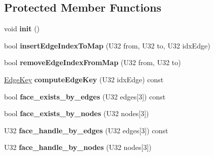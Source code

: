 \subsection*{Protected Member Functions}
\begin{DoxyCompactItemize}
\item 
\hypertarget{classps_1_1elastic_1_1VolMesh_abb320bf8584333cca98e316b8d5ad27d}{}void {\bfseries init} ()\label{classps_1_1elastic_1_1VolMesh_abb320bf8584333cca98e316b8d5ad27d}

\item 
\hypertarget{classps_1_1elastic_1_1VolMesh_a759d2e1cf8ba362be411646bfabc389e}{}bool {\bfseries insert\+Edge\+Index\+To\+Map} (U32 from, U32 to, U32 idx\+Edge)\label{classps_1_1elastic_1_1VolMesh_a759d2e1cf8ba362be411646bfabc389e}

\item 
\hypertarget{classps_1_1elastic_1_1VolMesh_aed8c037e96e3874e05af24e49dfd2746}{}bool {\bfseries remove\+Edge\+Index\+From\+Map} (U32 from, U32 to)\label{classps_1_1elastic_1_1VolMesh_aed8c037e96e3874e05af24e49dfd2746}

\item 
\hypertarget{classps_1_1elastic_1_1VolMesh_a277fde736ee27c4b6f8fdfbade377b77}{}\hyperlink{classps_1_1elastic_1_1EdgeKey}{Edge\+Key} {\bfseries compute\+Edge\+Key} (U32 idx\+Edge) const \label{classps_1_1elastic_1_1VolMesh_a277fde736ee27c4b6f8fdfbade377b77}

\item 
\hypertarget{classps_1_1elastic_1_1VolMesh_ae49c6f62434562e514c8c7b2bfe222d8}{}bool {\bfseries face\+\_\+exists\+\_\+by\+\_\+edges} (U32 edges\mbox{[}3\mbox{]}) const \label{classps_1_1elastic_1_1VolMesh_ae49c6f62434562e514c8c7b2bfe222d8}

\item 
\hypertarget{classps_1_1elastic_1_1VolMesh_a0203f03caae4eec5e116a23837090fe9}{}bool {\bfseries face\+\_\+exists\+\_\+by\+\_\+nodes} (U32 nodes\mbox{[}3\mbox{]})\label{classps_1_1elastic_1_1VolMesh_a0203f03caae4eec5e116a23837090fe9}

\item 
\hypertarget{classps_1_1elastic_1_1VolMesh_a4826f5ca02656c317bb5743885ec33ed}{}U32 {\bfseries face\+\_\+handle\+\_\+by\+\_\+edges} (U32 edges\mbox{[}3\mbox{]}) const \label{classps_1_1elastic_1_1VolMesh_a4826f5ca02656c317bb5743885ec33ed}

\item 
\hypertarget{classps_1_1elastic_1_1VolMesh_ae96ac686b704e333495b469874feabe0}{}U32 {\bfseries face\+\_\+handle\+\_\+by\+\_\+nodes} (U32 nodes\mbox{[}3\mbox{]})\label{classps_1_1elastic_1_1VolMesh_ae96ac686b704e333495b469874feabe0}


\end{DoxyCompactItemize}
